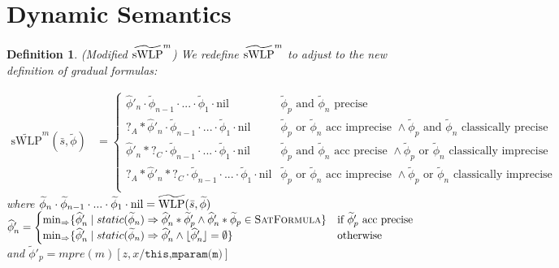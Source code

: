 \documentclass {article}
\newtheorem{definition}[theorem]{Definition}
\newcommand{\fphi}{\widehat{\phi}}
\newcommand{\tphi}{\widetilde{\phi}}
\newcommand{\imp}{\Rightarrow}
\newcommand{\twlp}[2]{\widetilde{\textup{WLP}}(#1,#2)}
\newcommand{\satdef}{\textsc{SatFormula}}
\newcommand{\nil}{\text{nil}}
\begin{document}
\section{Dynamic Semantics}
\label{section_dynamic}
\begin{definition} (Modified $\widetilde{\textup{sWLP}}^m$)
We redefine $\widetilde{\textup{sWLP}}^m$ to adjust to the new definition of gradual formulas:
\begin{center}
\begin{align*}
    \widetilde{\text{sWLP}}^m(\bar{s},\tphi) &= 
    \begin{cases}
    \fphi'_n \cdot \tphi_{n-1} \cdot ... \cdot \tphi_1\cdot \nil & \tphi_p\text{ and }\tphi_n\text{ precise }\\
    ?_A \ast \fphi'_n \cdot \tphi_{n-1} \cdot ... \cdot \tphi_1\cdot \nil & \tphi_p\text{ or }\tphi_n\text{ acc imprecise } \wedge \tphi_p\text{ and }\tphi_n \text{ classically precise}\\
    \fphi'_n \ast ?_C \cdot \tphi_{n-1} \cdot ... \cdot \tphi_1\cdot \nil & \tphi_p\text{ and }\tphi_n\text{ acc precise } \wedge \tphi_p\text{ or }\tphi_n \text{ classically imprecise}\\
    ?_A \ast \fphi'_n \ast ?_C \cdot \tphi_{n-1} \cdot ... \cdot \tphi_1\cdot \nil & \tphi_p\text{ or }\tphi_n\text{ acc imprecise } \wedge \tphi_p\text{ or }\tphi_n \text{ classically imprecise}\\
    \end{cases} 
\end{align*}
where $\tphi_n \cdot \tphi_{n-1} \cdot ... \cdot \tphi_1 \cdot \nil = \twlp{\bar{s}}{\tphi}$\\
$\fphi'_n = \begin{cases} 
\min_{\Rightarrow}\{\fphi'_n \mid static(\tphi_n) \imp \fphi'_n \ast \tphi'_p \wedge \fphi'_n \ast \tphi_p \in \satdef\} &\textup{if } \tphi'_p \textup{ acc precise}\\
\min_{\Rightarrow}\{\fphi'_n \mid  static(\tphi_n) \imp \fphi'_n\wedge \lfloor \fphi'_n \rfloor = \emptyset\} &\textup{otherwise}
\end{cases}$\\
and $\tphi'_p = mpre(m)[z,x/\texttt{this,mparam(m)}]$\\
\end{center}
\end{definition}
\end{document}
